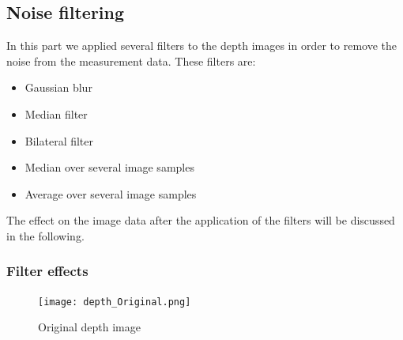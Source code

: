 \documentclass[DIV12,a4paper]{scrartcl}
\begin{document}
\subsection{Noise filtering}
\label{sec:filtering}
In this part we applied several filters to the depth images in order to remove the noise from the measurement data. These filters are:
\begin{itemize}
\item Gaussian blur
\item Median filter
\item Bilateral filter
\item Median over several image samples
\item Average over several image samples
\end{itemize}
The effect on the image data after the application of the filters will be discussed in the following.


\subsubsection{Filter effects}
\label{sec:filter_effects}
\begin{figure}[!htbp]
  \centering
  \texttt{[image: depth\_Original.png]}
  \caption{Original depth image}
  \label{fig:original_depth}
\end{figure}
\end{document}
